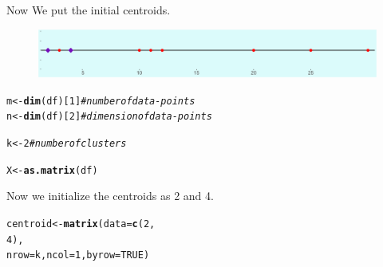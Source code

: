 \documentclass[11pt, a4paper]{article}\usepackage[]{graphicx}\usepackage[]{xcolor}
\makeatletter
\newcommand{\hlnum}[1]{\textcolor[rgb]{0.686,0.059,0.569}{#1}}%
\newcommand{\hlcom}[1]{\textcolor[rgb]{0.678,0.584,0.686}{\textit{#1}}}%
\newcommand{\hldef}[1]{\textcolor[rgb]{0.345,0.345,0.345}{#1}}%
\newcommand{\hlkwb}[1]{\textcolor[rgb]{0.69,0.353,0.396}{#1}}%
\newcommand{\hlkwc}[1]{\textcolor[rgb]{0.333,0.667,0.333}{#1}}%
\newcommand{\hlkwd}[1]{\textcolor[rgb]{0.737,0.353,0.396}{\textbf{#1}}}%
\newenvironment{kframe}{%
 \def\at@end@of@kframe{}%
 \ifinner\ifhmode%
  \def\at@end@of@kframe{\end{minipage}}%
  \begin{minipage}{\columnwidth}%
 \fi\fi%
 \def\FrameCommand##1{\hskip\@totalleftmargin \hskip-\fboxsep
 \colorbox{shadecolor}{##1}\hskip-\fboxsep
     \hskip-\linewidth \hskip-\@totalleftmargin \hskip\columnwidth}%
 \MakeFramed {\advance\hsize-\width
   \@totalleftmargin\z@ \linewidth\hsize
   \@setminipage}}%
 {\par\unskip\endMakeFramed%
 \at@end@of@kframe}
\newenvironment{knitrout}{}{} %
\makeatother
\begin{document}
Now We put the initial centroids.






\begin{figure}[!htbp]
\centering
\includegraphics[scale = 0.4]{initial_with_centroid.png}
\end{figure}

\begin{knitrout}
\color{fgcolor}\begin{kframe}
\begin{alltt}
\hldef{m} \hlkwb{<-} \hlkwd{dim}\hldef{(df)[}\hlnum{1}\hldef{]} \hlcom{# number of data-points}
\hldef{n} \hlkwb{<-} \hlkwd{dim}\hldef{(df)[}\hlnum{2}\hldef{]} \hlcom{# dimension of data-points}

\hldef{k} \hlkwb{<-} \hlnum{2} \hlcom{# number of clusters}
\end{alltt}
\end{kframe}
\end{knitrout}

\begin{knitrout}
\color{fgcolor}\begin{kframe}
\begin{alltt}
\hldef{X} \hlkwb{<-} \hlkwd{as.matrix}\hldef{(df)}
\end{alltt}
\end{kframe}
\end{knitrout}

Now we initialize the centroids as 2 and 4.

\begin{knitrout}
\color{fgcolor}\begin{kframe}
\begin{alltt}
\hldef{centroid} \hlkwb{<-} \hlkwd{matrix}\hldef{(}\hlkwc{data} \hldef{=} \hlkwd{c}\hldef{(}\hlnum{2}\hldef{,}
                            \hlnum{4}\hldef{),}
                   \hlkwc{nrow} \hldef{= k,} \hlkwc{ncol} \hldef{=} \hlnum{1}\hldef{,} \hlkwc{byrow} \hldef{=} \hlnum{TRUE}\hldef{)}
\end{alltt}
\end{kframe}
\end{knitrout}
\end{document}
